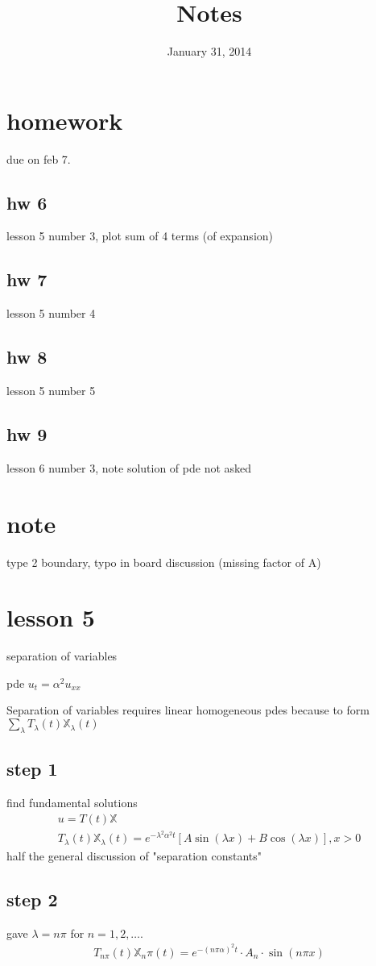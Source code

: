\documentclass{article}
\begin{document}
\title{Notes}
\date{January 31, 2014}
\maketitle
\section*{homework}
due on feb 7.
\subsection*{hw 6}
lesson 5 number 3, plot sum of 4 terms (of expansion)
\subsection*{hw 7}
lesson 5 number 4
\subsection*{hw 8}
lesson 5 number 5
\subsection*{hw 9}
lesson 6 number 3, note solution of pde not asked

\section*{note}
type 2 boundary, typo in board discussion (missing factor of A)

\section*{lesson 5}
separation of variables

pde $u_t=\alpha^2u_{xx}$

Separation of variables requires linear homogeneous pdes because to form $\sum\limits_\lambda T_\lambda(t)\mathbb{X}_\lambda(t)$
\subsection*{step 1}
find fundamental solutions
\begin{align*}
  u=T(t)\mathbb{X}\\
  T_\lambda(t)\mathbb{X}_\lambda(t)=e^{-\lambda^2\alpha^2t}[A\sin(\lambda x)+B\cos(\lambda x)], x>0
\end{align*}
half the general discussion of "separation constants"
\subsection*{step 2}
gave $\lambda=n\pi$ for $n=1,2,\dots$.
\begin{align*}
  T_{n\pi}(t)\mathbb{X}_n\pi(t)=e^{-(n\pi\alpha)^2t}\cdot A_n\cdot\sin(n\pi x)
\end{align*}
\end{document}
